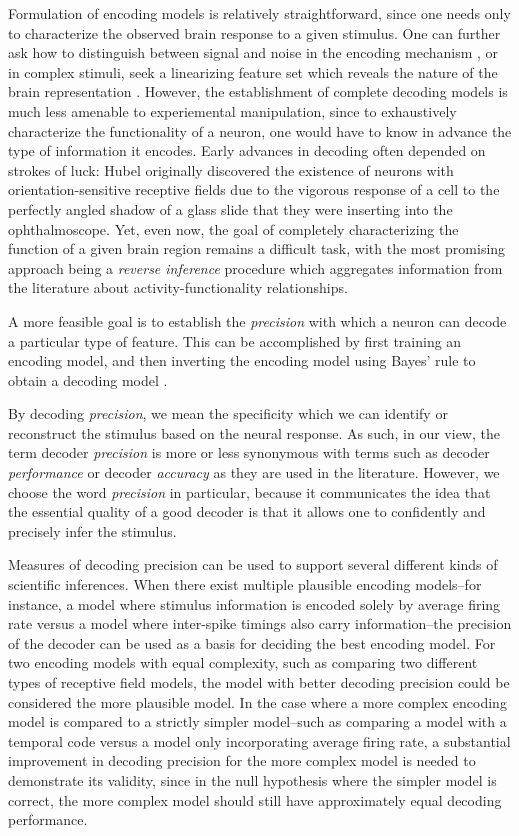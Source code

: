 \documentclass[12pt]{article}
\begin{document}
Formulation of encoding models is relatively straightforward, since
one needs only to characterize the observed brain response to a given
stimulus.  One can further ask how to distinguish between signal and
noise in the encoding mechanism \cite{Nelken2005}, or in complex
stimuli, seek a linearizing feature set which reveals the nature of
the brain representation \cite{Naselaris2011}.  However, the
establishment of complete decoding models is much less amenable to
experiemental manipulation, since to exhaustively characterize the
functionality of a neuron, one would have to know in advance the type
of information it encodes.  Early advances in decoding often depended
on strokes of luck: Hubel \cite{Hubel1982} originally discovered the
existence of neurons with orientation-sensitive receptive fields due
to the vigorous response of a cell to the perfectly angled shadow of a
glass slide that they were inserting into the ophthalmoscope.  Yet,
even now, the goal of completely characterizing the function of a
given brain region remains a difficult task, with the most promising
approach being a \emph{reverse inference}
procedure \cite{Poldrack2006} which aggregates information from the
literature about activity-functionality relationships.

A more feasible goal is to establish the \emph{precision} with which a
neuron can decode a particular type of feature.  This can be
accomplished by first training an encoding model, and then inverting
the encoding model using Bayes' rule to obtain a decoding
model \cite{Oram1998}\cite{QuianQuiroga2009}\cite{Naselaris2011}.  

By decoding \emph{precision}, we mean the specificity which we can
identify or reconstruct the stimulus based on the neural response.  As
such, in our view, the term decoder \emph{precision} is more or less
synonymous with terms such as decoder \emph{performance} or
decoder \emph{accuracy} as they are used in the literature.  However,
we choose the word \emph{precision} in particular, because it
communicates the idea that the essential quality of a good decoder is
that it allows one to confidently and precisely infer the stimulus.

Measures of decoding precision can be used to support several
different kinds of scientific inferences.  When there exist multiple
plausible encoding models--for instance, a model where stimulus
information is encoded solely by average firing rate versus a model
where inter-spike timings also carry information--the precision of the
decoder can be used as a basis for deciding the best encoding model.
For two encoding models with equal complexity, such as comparing two
different types of receptive field models, the model with better
decoding precision could be considered the more plausible model.  In
the case where a more complex encoding model is compared to a strictly
simpler model--such as comparing a model with a temporal code versus a
model only incorporating average firing rate, a substantial
improvement in decoding precision for the more complex model is needed
to demonstrate its validity, since in the null hypothesis where the
simpler model is correct, the more complex model should still have
approximately equal decoding performance.
\end{document}
